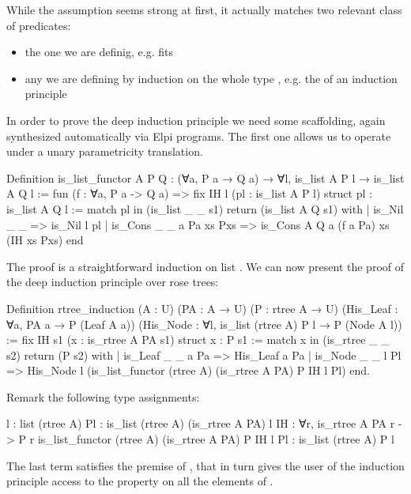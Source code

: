 \documentclass[a4paper, 11pt]{book}
\begin{document}
While the assumption seems strong at first, it actually matches two relevant class
of predicates:
\begin{itemize}
  \item the one we are definig, e.g.  fits
  \item any  we are defining by induction on the whole
    type , e.g. the  of an induction principle
\end{itemize}

In order to prove the deep induction principle we need some scaffolding,
again synthesized automatically via Elpi programs. The first one
allows us to operate under a unary parametricity translation.

\begin{coqcode}
Definition is_list_functor A P Q :
  (∀a, P a → Q a) → ∀l, is_list A P l → is_list A Q l
:=
  fun (f : ∀a, P a -> Q a) =>
    fix IH l (pl : is_list A P l) {struct pl} : is_list A Q l :=
      match pl in (is_list _ _ s1) return (is_list A Q s1) with
      | is_Nil _ _ => is_Nil l pl
      | is_Cons _ _ a Pa xs Pxs =>
          is_Cons A Q a (f a Pa) xs (IH xs Pxs)
      end
\end{coqcode}

The proof is a straightforward induction on list .
We can now present the proof of the deep induction principle over rose trees:

\begin{coqcode}
Definition rtree_induction (A : U) (PA : A → U) (P : rtree A → U)
    (His_Leaf : ∀a, PA a → P (Leaf A a))
    (His_Node : ∀l, is_list (rtree A) P l → P (Node A l))
:=
  fix IH s1 (x : is_rtree A PA s1) {struct x} : P s1 :=
  match x in (is_rtree _ _ s2) return (P s2) with
  | is_Leaf _ _ a Pa =>
      His_Leaf a Pa
  | is_Node _ _ l Pl =>
      His_Node l (is_list_functor (rtree A) (is_rtree A PA) P IH l Pl)
  end.
\end{coqcode}

Remark the following type assignments:

\begin{coqcode}
l : list (rtree A)
Pl : is_list (rtree A) (is_rtree A PA) l
IH : ∀r, is_rtree A PA r -> P r
is_list_functor (rtree A) (is_rtree A PA) P IH l Pl :
  is_list (rtree A) P l
\end{coqcode}

The last term satisfies the premise of , that in turn
gives the user of the induction principle access to the property 
on all the elements of .
\end{document}
